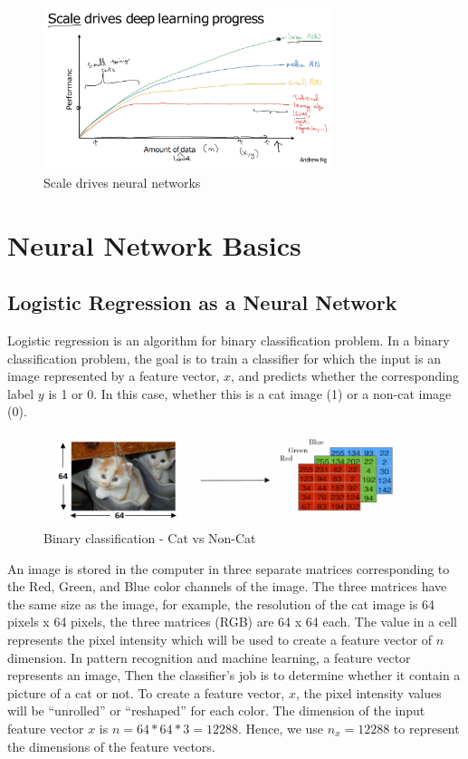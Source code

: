 \documentclass[letterpaper,12pt,notitlepage,twoside]{report}
\begin{document}
\begin{figure}[h]
	\centering
	\includegraphics[width=0.75\textwidth]{Images/Scale and neural network.png}
	\caption{Scale drives neural networks}
	\label{fig:4}
\end{figure}
\FloatBarrier

\section{Neural Network Basics}
\subsection{Logistic Regression as a Neural Network}
Logistic regression is an algorithm for binary classification problem.  In a binary classification problem,  the goal is to train a classifier for which the input is an image represented by a feature vector, $x$, and predicts whether the corresponding label $y$ is 1 or 0. In this case, whether this is a cat image (1) or a non-cat image (0). 

\begin{figure}[h]
	\centering
	\includegraphics[width=0.95\textwidth]{Images/Binary classification cat example.png}
	\caption{Binary classification - Cat vs Non-Cat}
	\label{fig:5}
\end{figure}
\FloatBarrier

An image is stored in the computer in three separate matrices corresponding to the Red, Green, and Blue color channels of the image. The three matrices have the same size as the image, for example, the resolution of the cat image is 64 pixels x 64 pixels, the three matrices (RGB) are 64 x 64 each. The value in a cell represents the pixel intensity which will be used to create a feature vector of $n$ dimension. In pattern recognition and machine learning, a feature vector represents an image, Then the classifier's job is to determine whether it contain a picture of a cat or not.
To create a feature vector, $x$, the pixel intensity values will be ``unrolled'' or ``reshaped'' for each color. The dimension of the input feature vector $x$ is $n = 64* 64* 3 = 12288$. Hence, we use $n_x = 12288$ to represent the dimensions of the feature vectors. 
\end{document}
